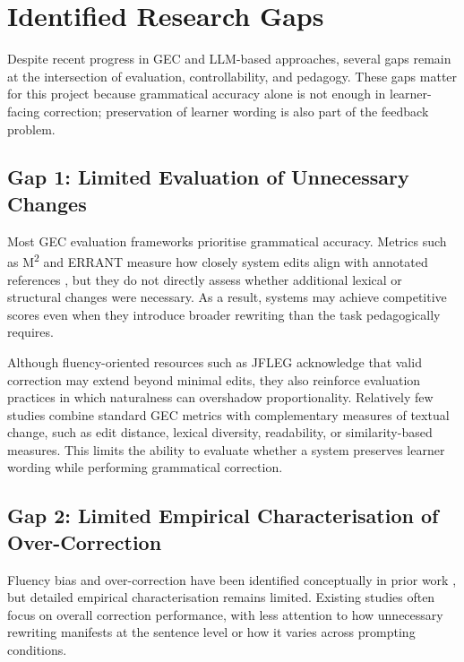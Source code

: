 \vspace{3cm}

\section{Identified Research Gaps}

Despite recent progress in GEC and LLM-based approaches, several gaps remain at the intersection of evaluation, controllability, and pedagogy. These gaps matter for this project because grammatical accuracy alone is not enough in learner-facing correction; preservation of learner wording is also part of the feedback problem.

\subsection{Gap 1: Limited Evaluation of Unnecessary Changes}

Most GEC evaluation frameworks prioritise grammatical accuracy. Metrics such as M\textsuperscript{2} and ERRANT measure how closely system edits align with annotated references \cite{dahlmeier-ng-2012-better,bryant-etal-2017-automatic}, but they do not directly assess whether additional lexical or structural changes were necessary. As a result, systems may achieve competitive scores even when they introduce broader rewriting than the task pedagogically requires.

Although fluency-oriented resources such as JFLEG \cite{napoles-etal-2017-jfleg} acknowledge that valid correction may extend beyond minimal edits, they also reinforce evaluation practices in which naturalness can overshadow proportionality. Relatively few studies combine standard GEC metrics with complementary measures of textual change, such as edit distance, lexical diversity, readability, or similarity-based measures. This limits the ability to evaluate whether a system preserves learner wording while performing grammatical correction.

\subsection{Gap 2: Limited Empirical Characterisation of Over-Correction}

Fluency bias and over-correction have been identified conceptually in prior work \cite{loem2023exploringeffectivenessgpt3grammatical}, but detailed empirical characterisation remains limited. Existing studies often focus on overall correction performance, with less attention to how unnecessary rewriting manifests at the sentence level or how it varies across prompting conditions.

